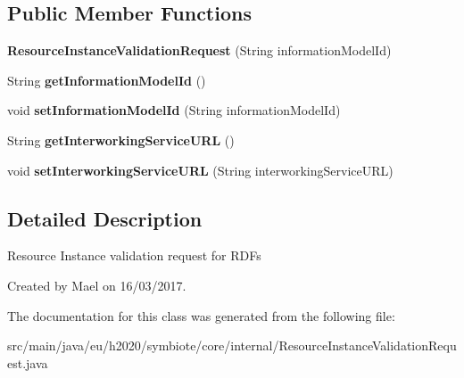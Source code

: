 \subsection*{Public Member Functions}
\begin{DoxyCompactItemize}
\item 
\mbox{\label{classeu_1_1h2020_1_1symbiote_1_1core_1_1internal_1_1ResourceInstanceValidationRequest_aade3dad1a832033e51aebdf2139927c5}} 
{\bfseries Resource\+Instance\+Validation\+Request} (String information\+Model\+Id)
\item 
\mbox{\label{classeu_1_1h2020_1_1symbiote_1_1core_1_1internal_1_1ResourceInstanceValidationRequest_a6e213f276f80fd9a887627f32ecc861d}} 
String {\bfseries get\+Information\+Model\+Id} ()
\item 
\mbox{\label{classeu_1_1h2020_1_1symbiote_1_1core_1_1internal_1_1ResourceInstanceValidationRequest_a0c0ae7a169bdd161faccc86efd1aa951}} 
void {\bfseries set\+Information\+Model\+Id} (String information\+Model\+Id)
\item 
\mbox{\label{classeu_1_1h2020_1_1symbiote_1_1core_1_1internal_1_1ResourceInstanceValidationRequest_a5fa414cf464ecba0fec8fa2597a52d65}} 
String {\bfseries get\+Interworking\+Service\+U\+RL} ()
\item 
\mbox{\label{classeu_1_1h2020_1_1symbiote_1_1core_1_1internal_1_1ResourceInstanceValidationRequest_a86d0cea2f67ea675f10de96d233f3118}} 
void {\bfseries set\+Interworking\+Service\+U\+RL} (String interworking\+Service\+U\+RL)
\end{DoxyCompactItemize}


\subsection{Detailed Description}
Resource Instance validation request for R\+D\+Fs 

Created by Mael on 16/03/2017. 

The documentation for this class was generated from the following file\+:\begin{DoxyCompactItemize}
\item 
src/main/java/eu/h2020/symbiote/core/internal/Resource\+Instance\+Validation\+Request.\+java\end{DoxyCompactItemize}
